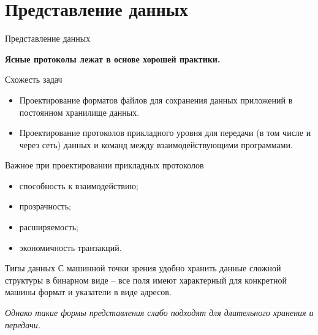 

\subtitle{Форматы данных \\и проектирование пользовательских протоколов}



%
%

\section{Представление данных}

\begin{frame}{Представление данных}
	\begin{center}
	{\Large\bfseries Ясные протоколы лежат в основе хорошей практики.}
	\end{center}
\end{frame}

\begin{frame}{Схожесть задач}
	\begin{itemize}
		\item Проектирование форматов файлов для сохранения данных приложений в постоянном хранилище данных.
		\item Проектирование протоколов прикладного уровня для передачи (в том числе и через сеть) данных и команд между взаимодействующими программами.
	\end{itemize}
\end{frame}

\begin{frame}{Важное при проектировании прикладных протоколов}
	\begin{itemize}
		\item способность к взаимодействию; 
			\pause
		\item прозрачность;
			\pause
		\item расширяемость;
			\pause
		\item экономичность транзакций.
	\end{itemize}
\end{frame}

\begin{frame}{Типы данных}
	С машинной точки зрения удобно хранить данные сложной структуры в бинарном виде -- все поля имеют характерный для конкретной машины формат и указатели в виде адресов.

	\pause
	{\itshape Однако такие формы представления слабо подходят для длительного хранения и передачи.}
\end{frame}

